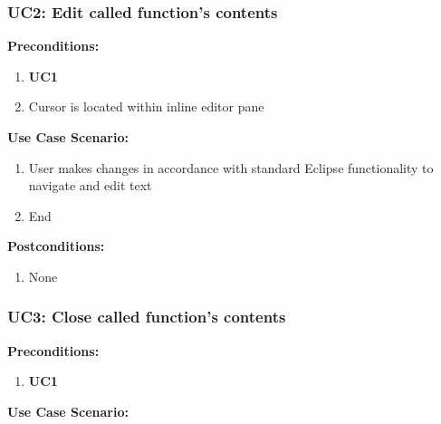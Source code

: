 \documentclass[]{report}
\begin{document}
		\subsubsection{UC2:  Edit called function's contents}
		
			\textbf{Preconditions:}
		
				\begin{enumerate}
					
					\item \textbf{UC1}
					
					\item Cursor is located within inline editor pane
					
				\end{enumerate}
		
			\noindent\textbf{Use Case Scenario:}
			
				\begin{enumerate}
					\item
					User makes changes in accordance with standard Eclipse functionality to navigate and edit text
					
					\item
					End
				\end{enumerate}
			
			\noindent\textbf{Postconditions:}
			
				\begin{enumerate}
					
					\item 
					None
					
				\end{enumerate}
			
		\vspace{0.25in}
		
		\subsubsection{UC3:  Close called function's contents}
		
		\textbf{Preconditions:}
		
		\begin{enumerate}
			
			\item \textbf{UC1}
			
		\end{enumerate}
		
		\noindent\textbf{Use Case Scenario:}
		
\end{document}
